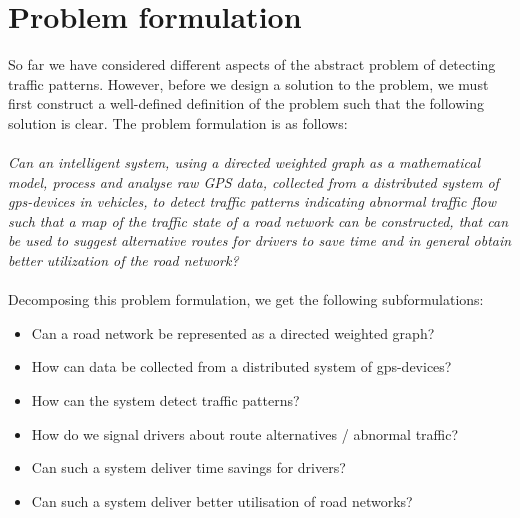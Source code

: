 \section{Problem formulation}
So far we have considered different aspects of the abstract problem of detecting traffic patterns. However, before we design a solution to the problem, we must first construct a well-defined definition of the problem such that the following solution is clear. The problem formulation is as follows:
\\\\
\emph{Can an intelligent system, using a directed weighted graph as a mathematical model, process and analyse raw GPS data, collected from a distributed system of gps-devices in vehicles, to detect traffic patterns indicating abnormal traffic flow such that a map of the traffic state of a road network can be constructed, that can be used to suggest alternative routes for drivers to save time and in general obtain better utilization of the road network?}
\\\\
Decomposing this problem formulation, we get the following subformulations:

\begin{itemize}
\item Can a road network be represented as a directed weighted graph?
\item How can data be collected from a distributed system of gps-devices?
\item How can the system detect traffic patterns?
\item How do we signal drivers about route alternatives / abnormal traffic?
\item Can such a system deliver time savings for drivers?
\item Can such a system deliver better utilisation of road networks?
\end{itemize}



% 